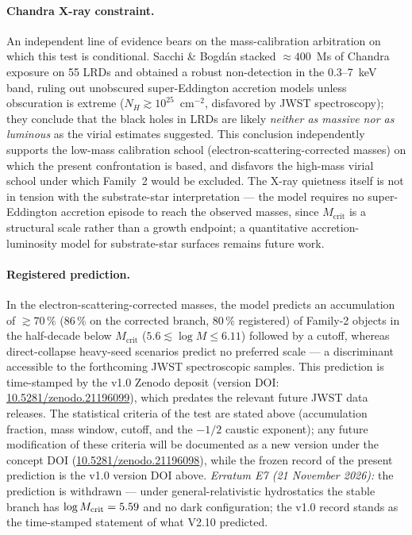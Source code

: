 \documentclass[11pt,a4paper]{article}
\theoremstyle{plain}
\theoremstyle{remark}
\begin{document}
\paragraph{Chandra X-ray constraint.} An independent line of evidence bears on the mass-calibration arbitration on which this test is conditional. Sacchi \& Bogd\'an \cite{sacchi2025} stacked $\approx400$~Ms of Chandra exposure on 55 LRDs and obtained a robust non-detection in the 0.3--7~keV band, ruling out unobscured super-Eddington accretion models unless obscuration is extreme ($N_H \gtrsim 10^{25}$~cm$^{-2}$, disfavored by JWST spectroscopy); they conclude that the black holes in LRDs are likely \emph{neither as massive nor as luminous} as the virial estimates suggested. This conclusion independently supports the low-mass calibration school (electron-scattering-corrected masses) on which the present confrontation is based, and disfavors the high-mass virial school under which Family~2 would be excluded. The X-ray quietness itself is not in tension with the substrate-star interpretation --- the model requires no super-Eddington accretion episode to reach the observed masses, since $M_{\text{crit}}$ is a structural scale rather than a growth endpoint; a quantitative accretion-luminosity model for substrate-star surfaces remains future work.

\paragraph{Registered prediction.} In the electron-scattering-corrected masses, the model predicts an accumulation of $\gtrsim 70\,\%$ ($86\,\%$ on the corrected branch, $80\,\%$ registered) of Family-2 objects in the half-decade below $M_{\text{crit}}$ ($5.6 \lesssim \log M \leq 6.11$) followed by a cutoff, whereas direct-collapse heavy-seed scenarios \cite{jeon2026} predict no preferred scale --- a discriminant accessible to the forthcoming JWST spectroscopic samples. This prediction is time-stamped by the v1.0 Zenodo deposit (version DOI: \href{https://doi.org/10.5281/zenodo.21196099}{10.5281/zenodo.21196099}), which predates the relevant future JWST data releases. The statistical criteria of the test are stated above (accumulation fraction, mass window, cutoff, and the $-1/2$ caustic exponent); any future modification of these criteria will be documented as a new version under the concept DOI (\href{https://doi.org/10.5281/zenodo.21196098}{10.5281/zenodo.21196098}), while the frozen record of the present prediction is the v1.0 version DOI above. \emph{Erratum E7 (21 November 2026):} the prediction is withdrawn --- under general-relativistic hydrostatics the stable branch has $\log M_{\rm crit} = 5.59$ and no dark configuration; the v1.0 record stands as the time-stamped statement of what V2.10 predicted.
\end{document}
